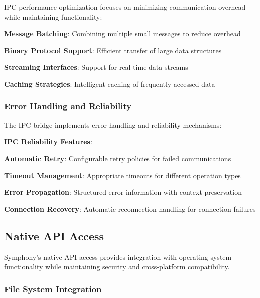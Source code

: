 IPC performance optimization focuses on minimizing communication overhead while maintaining functionality:

\begin{compactlist}
    \item \textbf{Message Batching}: Combining multiple small messages to reduce overhead
    \item \textbf{Binary Protocol Support}: Efficient transfer of large data structures
    \item \textbf{Streaming Interfaces}: Support for real-time data streams
    \item \textbf{Caching Strategies}: Intelligent caching of frequently accessed data
\end{compactlist}

\subsubsection*{Error Handling and Reliability}

The IPC bridge implements error handling and reliability mechanisms:

\begin{alertbox}
\textbf{IPC Reliability Features}:
\begin{compactlist}
    \item \textbf{Automatic Retry}: Configurable retry policies for failed communications
    \item \textbf{Timeout Management}: Appropriate timeouts for different operation types
    \item \textbf{Error Propagation}: Structured error information with context preservation
    \item \textbf{Connection Recovery}: Automatic reconnection handling for connection failures
\end{compactlist}
\end{alertbox}

\subsection*{Native API Access}

Symphony's native API access provides integration with operating system functionality while maintaining security and cross-platform compatibility.

\subsubsection*{File System Integration}

